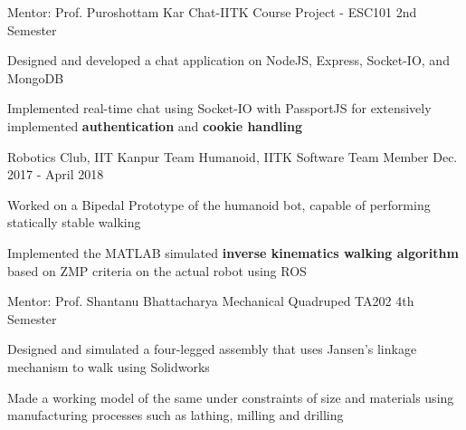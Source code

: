 \begin{cventries}
  \cventry
    {Mentor: Prof. Puroshottam Kar}
    {Chat-IITK}
    {Course Project - ESC101}
    {2nd Semester}
    {
      \begin{cvitems}
        \item {Designed and developed a chat application on NodeJS, Express, Socket-IO, and MongoDB}
        \item {Implemented real-time chat using Socket-IO with PassportJS for extensively implemented \textbf{authentication} and \textbf{cookie handling}}
      \end{cvitems}
    }

  \cventry
    {Robotics Club, IIT Kanpur}
    {Team Humanoid, IITK}
    {Software Team Member}
    {Dec. 2017 - April 2018} 
    {
      \begin{cvitems} 
        \item {Worked on a Bipedal Prototype of the humanoid bot, capable of performing statically stable walking}
        \item {Implemented the MATLAB simulated \textbf{inverse kinematics walking algorithm} based on ZMP criteria on the actual robot using ROS}
      \end{cvitems}
    }


  \smallcventry
    {Mentor: Prof. Shantanu Bhattacharya}
    {Mechanical Quadruped}
    {TA202}
    {4th Semester}
    {}
    {
      \begin{cvitems}
        \item Designed and simulated a four-legged assembly that uses Jansen's linkage mechanism to walk using Solidworks
        \item Made a working model of the same under constraints of size and materials using manufacturing processes such as lathing, milling and drilling
      \end{cvitems}
    } 

\end{cventries}
\vspace{-2mm}




